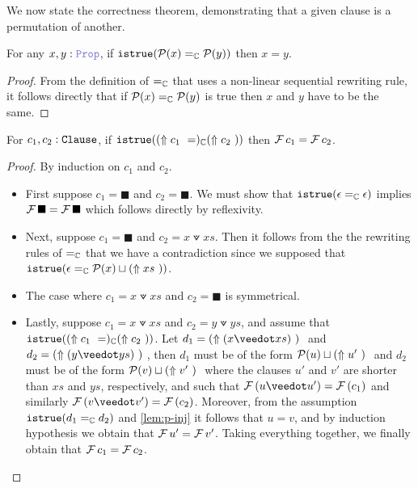We now state the correctness theorem, demonstrating that a given clause is a permutation of another.

\begin{lemma}[P-injective]\label{lem:p-inj}
For any $x, y: \prop$, if $\kw{istrue}(\cal{P}(x) =_{\bb{C}} \cal{P}(y))$ then $x = y$.
\begin{proof}
From the definition of $=_{\bb{C}}$ that uses a non-linear sequential rewriting rule,
it follows directly that if $\cal{P}(x) =_{\bb{C}} \cal{P}(y)$ is true then $x$ and $y$ have to be the same.
\end{proof}
\end{lemma}


\begin{theorem}[Correctness]\label{lem:eq-C}
For $c_1, c_2 : \tt{Clause}$, if $\tt{istrue} (\reify{c_1} =_{\bb{C}} \reify{c_2})$ then $\cal{F}\,c_1 = \cal{F}\,c_2$.
\end{theorem}
\begin{proof}
By induction on $c_1$ and $c_2$.
\begin{itemize}
  \item First suppose $c_1 = \blacksquare$ and $c_2 = \blacksquare$. We must show that $\tt{istrue} (\epsilon =_{\bb{C}} \epsilon)$ implies $\cal{F}\, \blacksquare = \cal{F}\, \blacksquare$ which follows directly by reflexivity.
  \item Next, suppose $c_1 = \blacksquare$ and $c_2 = x \veedot xs$. Then it follows from the the rewriting rules of $=_{\bb{C}}$ that we have a contradiction since we supposed that $\tt{istrue}(\epsilon =_{\bb{C}} \cal{P}(x) \sqcup \reify{xs})$.
  \item The case where $c_1 = x \veedot xs$ and $c_2 = \blacksquare$ is symmetrical.
  \item Lastly, suppose $c_1 = x \veedot xs$ and $c_2 = y \veedot ys$, and
  assume that $\tt{istrue}(\reify{c_1} =_{\bb{C}} \reify{c_2})$.
  Let $d_1 = \reify{(x \veedot xs)}$ and $d_2 = \reify{(y \veedot ys)}$, then $d_1$ must be of the form
  $\cal{P}(u) \sqcup \reify{u'}$ and $d_2$ must be of the form $\cal{P}(v) \sqcup \reify{v'}$ where
  the clauses $u'$ and $v'$ are shorter than $xs$ and $ys$, respectively, and such that
  $\cal{F}\,(u \veedot u') = \cal{F}\,(c_1)$ and similarly
  $\cal{F}\,(v \veedot v') = \cal{F}\,(c_2)$.
  Moreover, from the assumption $\tt{istrue}(d_1 =_{\bb{C}} d_2)$ and \cref{lem:p-inj} it follows that
  $u = v$, and by induction hypothesis we obtain that $\cal{F}\,u' = \cal{F}\,v'$. Taking everything
  together, we finally obtain that $\cal{F}\,c_1 = \cal{F}\,c_2$.
\end{itemize}
\end{proof}

